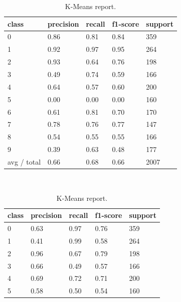 \documentclass[a4paper,11pt]{article}
\begin{document}
\begin{table}
    \centering
    \begin{subtable}[b]{\textwidth}
        \centering
        \begin{tabularx}{\textwidth}{X|X|X|X|X}
            class        & precision & recall & f1-score & support \\
            \hline
            0           & 0.86      & 0.81   & 0.84     & 359 \\
            1           & 0.92      & 0.97   & 0.95     & 264 \\
            2           & 0.93      & 0.64   & 0.76     & 198 \\
            3           & 0.49      & 0.74   & 0.59     & 166 \\
            4           & 0.64      & 0.57   & 0.60     & 200 \\
            5           & 0.00      & 0.00   & 0.00     & 160 \\
            6           & 0.61      & 0.81   & 0.70     & 170 \\
            7           & 0.78      & 0.76   & 0.77     & 147 \\
            8           & 0.54      & 0.55   & 0.55     & 166 \\
            9           & 0.39      & 0.63   & 0.48     & 177 \\
            \hline
            avg / total & 0.66      & 0.68   & 0.66     & 2007
        \end{tabularx}
        \caption{\small{K-Means report.}}
        \label{tab:assignment9_1}
    \end{subtable}
    \\
    \begin{subtable}[b]{\textwidth}
        \centering
        \begin{tabularx}{\textwidth}{X|X|X|X|X}
            class       & precision & recall & f1-score & support \\
            \hline
            0           & 0.63      & 0.97   &  0.76    & 359 \\
            1           & 0.41      & 0.99   &  0.58    & 264 \\
            2           & 0.96      & 0.67   &  0.79    & 198 \\
            3           & 0.66      & 0.49   &  0.57    & 166 \\
            4           & 0.69      & 0.72   &  0.71    & 200 \\
            5           & 0.58      & 0.50   &  0.54    & 160 \\

\end{tabularx}
\end{subtable}
\end{table}
\end{document}
